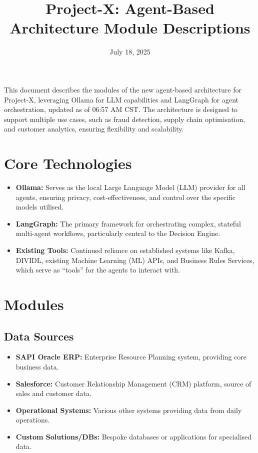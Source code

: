 \documentclass{article}
\title{Project-X: Agent-Based Architecture Module Descriptions}
\author{}
\date{July 18, 2025}
\begin{document}
\maketitle

This document describes the modules of the new agent-based architecture for Project-X, leveraging Ollama for LLM capabilities and LangGraph for agent orchestration, updated as of 06:57 AM CST. The architecture is designed to support multiple use cases, such as fraud detection, supply chain optimisation, and customer analytics, ensuring flexibility and scalability.

\section{Core Technologies}
\begin{itemize}
    \item \textbf{Ollama:} Serves as the local Large Language Model (LLM) provider for all agents, ensuring privacy, cost-effectiveness, and control over the specific models utilised.
    \item \textbf{LangGraph:} The primary framework for orchestrating complex, stateful multi-agent workflows, particularly central to the Decision Engine.
    \item \textbf{Existing Tools:} Continued reliance on established systems like Kafka, DIVIDL, existing Machine Learning (ML) APIs, and Business Rules Services, which serve as ``tools'' for the agents to interact with.
\end{itemize}

\section{Modules}

\subsection{Data Sources}
\begin{itemize}
    \item \textbf{SAPI Oracle ERP:} Enterprise Resource Planning system, providing core business data.
    \item \textbf{Salesforce:} Customer Relationship Management (CRM) platform, source of sales and customer data.
    \item \textbf{Operational Systems:} Various other systems providing data from daily operations.
    \item \textbf{Custom Solutions/DBs:} Bespoke databases or applications for specialised data.
\end{itemize}
\end{document}
